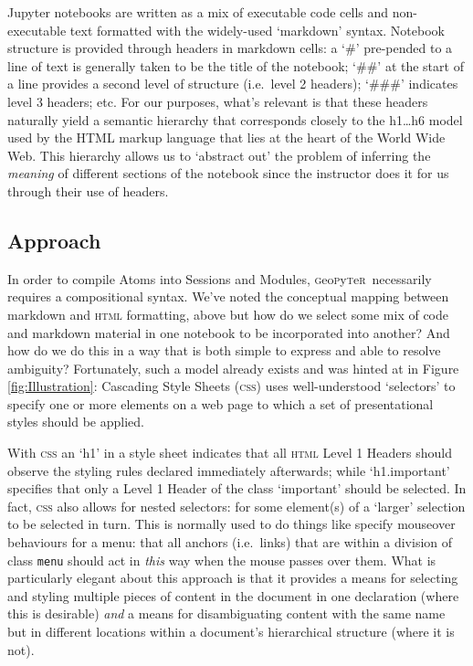 \documentclass[letter, 11pt,titlepage]{article}
\newcommand{\gp}{\textsc{g}eo\textsc{p}y\textsc{t}e\textsc{r}~\/}
\newcommand{\ie}{i.e.~\/}
\begin{document}
Jupyter notebooks are written as a mix of executable code cells and
non-executable text formatted with the widely-used `markdown' syntax. Notebook
structure is provided through headers in markdown cells: a `\#' pre-pended to a
line of text is generally taken to be the title of the notebook; `\#\#' at the
start of a line provides a second level of structure (\ie level 2 headers);
`\#\#\#' indicates level 3 headers; etc. For our purposes, what's relevant is
that these headers naturally yield a semantic hierarchy that corresponds closely to the h1\ldots{}h6 model used by the HTML markup language that lies at the heart of the World Wide Web. This hierarchy allows us to `abstract out' the problem of inferring the \emph{meaning} of different sections of the notebook since the instructor does it for us through their use of headers.

\subsection{Approach}

In order to compile Atoms into Sessions and Modules, \gp necessarily requires a compositional syntax. We've noted the conceptual mapping between markdown and \textsc{html} formatting, above but how do we select some mix of code and markdown material in one notebook to be incorporated into another? And how do we do this in a way that is both simple to express and able to resolve ambiguity? Fortunately, such a model already exists and was hinted at in Figure \ref{fig:Illustration}: Cascading Style Sheets (\textsc{css}) uses well-understood `selectors' to specify one or more elements on a web page to which a set of presentational styles should be applied. 

With \textsc{css} an `h1' in a style sheet indicates that all \textsc{html} Level 1 Headers should observe the styling rules declared immediately afterwards; while `h1.important' specifies that only a Level 1 Header of the class `important' should be selected. In fact, \textsc{css} also allows for nested selectors: for some element(s) of a `larger' selection to be selected in turn. This is normally used to do things like specify mouseover behaviours for a menu: that all anchors (\ie links) that are within a division of class \texttt{menu} should act in \textit{this} way when the mouse passes over them. What is particularly elegant about this approach is that it provides a means for selecting and styling multiple pieces of content in the document in one declaration (where this is desirable) \textit{and} a means for disambiguating content with the same name but in different locations within a document's hierarchical structure (where it is not). 
\end{document}
